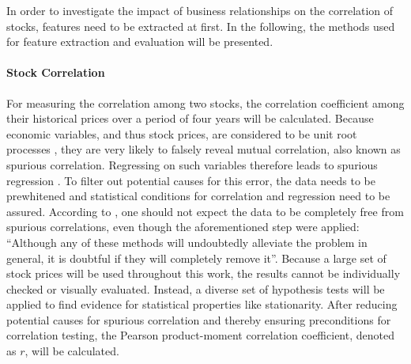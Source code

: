 In order to investigate the impact of business relationships on the correlation of stocks, features need to be extracted at first. In the following, the methods used for feature extraction and evaluation will be presented.

\paragraph{Stock Correlation}
For measuring the correlation among two stocks, the correlation coefficient among their historical prices over a period of four years will be calculated. Because economic variables, and thus stock prices, are considered to be unit root processes \cite{Granger1974SpuriousEconometrics}, they are very likely to falsely reveal mutual correlation, also known as spurious correlation. Regressing on such variables therefore leads to spurious regression \cite{Yule1926WhyTime-Series}. To filter out potential causes for this error, the data needs to be prewhitened \cite{Dean2016DangersModels} and statistical conditions for correlation and regression need to be assured. According to \citet{Granger1974SpuriousEconometrics}, one should not expect the data to be completely free from spurious correlations, even though the aforementioned step were applied: \enquote{Although any of these methods will undoubtedly alleviate the problem in general, it is doubtful if they will completely remove it}. Because a large set of stock prices will be used throughout this work, the results cannot be individually checked or visually evaluated. Instead, a diverse set of hypothesis tests will be applied to find evidence for statistical properties like stationarity. After reducing potential causes for spurious correlation and thereby ensuring preconditions for correlation testing, the Pearson product-moment correlation coefficient, denoted as $r$, will be calculated.

